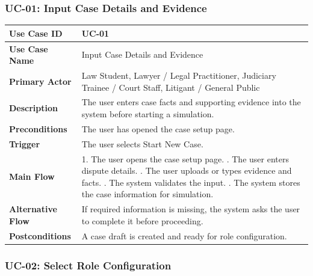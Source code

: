 \subsubsection{UC-01: Input Case Details and Evidence}

\begin{longtable}{|p{4cm}|p{10cm}|}
\hline
\textbf{Use Case ID} & UC-01 \\ \hline
\textbf{Use Case Name} & Input Case Details and Evidence \\ \hline
\textbf{Primary Actor} & Law Student, Lawyer / Legal Practitioner, Judiciary Trainee / Court Staff, Litigant / General Public \\ \hline
\textbf{Description} & The user enters case facts and supporting evidence into the system before starting a simulation. \\ \hline
\textbf{Preconditions} & The user has opened the case setup page. \\ \hline
\textbf{Trigger} & The user selects Start New Case. \\ \hline
\textbf{Main Flow} & 
1. The user opens the case setup page. \newline
2. The user enters dispute details. \newline
3. The user uploads or types evidence and facts. \newline
4. The system validates the input. \newline
5. The system stores the case information for simulation. \\ \hline
\textbf{Alternative Flow} & 
If required information is missing, the system asks the user to complete it before proceeding. \\ \hline
\textbf{Postconditions} & 
A case draft is created and ready for role configuration. \\ \hline
\end{longtable}

\subsubsection{UC-02: Select Role Configuration}

